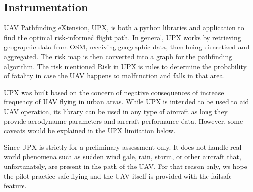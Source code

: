 \documentclass[12pt]{report}
\begin{document}
        \subsection{Instrumentation}
        UAV Pathfinding eXtension, UPX, is both a python libraries and application to find the optimal risk-informed
        flight path. In general, UPX works by retrieving geographic data from OSM, receiving geographic data, then being
        discretized and aggregated. The risk map is then converted into a graph for the pathfinding algorithm. The risk
        mentioned Risk in UPX is rules to determine the probability of fatality in case the UAV happens to malfunction
        and falls in that area.
            
        UPX was built based on the concern of negative consequences of increase frequency of UAV flying in urban areas.
        While UPX is intended to be used to aid UAV operation, its library can be used in any type of aircraft as long
        they provide aerodynamic parameters and aircraft performance data. However, some caveats would be explained in
        the UPX limitation below.

        Since UPX is strictly for a preliminary assessment only. It does not handle real-world phenomena such as
        sudden wind gale, rain, storm, or other aircraft that, unfortunately, are present in the path of the UAV. For
        that reason only, we hope the pilot practice safe flying and the UAV itself is provided with the failsafe
        feature.
\end{document}
